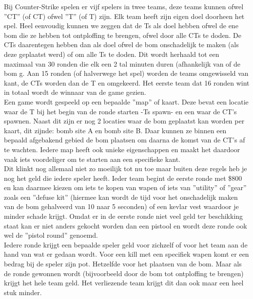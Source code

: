 \documentclass[pdftex,a4paper,12pt,twoside]{report}
\begin{document}
Bij Counter-Strike spelen er vijf spelers in twee teams, deze teams kunnen ofwel ''\gls{CT}'' (of CT) ofwel ''\gls{T}'' (of T) zijn. Elk team heeft zijn eigen doel doorheen het spel. Heel eenvoudig kunnen we zeggen dat de \gls{T}s als doel hebben ofwel de ene bom die ze hebben tot ontploffing te brengen, ofwel door alle \gls{CT}s te doden. 
De \gls{CT}s daarentegen hebben dan als doel ofwel de bom onschadelijk te maken (als deze geplaatst werd) of om alle \gls{T}s te doden. Dit wordt herhaald tot een maximaal van 30 ronden die elk een 2 tal minuten duren (afhankelijk van of de bom g. Aan 15 ronden (of halverwege het spel) worden de teams omgewisseld van kant, de \gls{CT}s worden dan de \gls{T} en omgekeerd. Het eerste team dat 16 ronden wint in totaal wordt de winnaar van de game gezien.
\\

Een game wordt gespeeld op een bepaalde ''\gls{map}'' of kaart. Deze bevat een locatie waar de \gls{T} bij het begin van de ronde starten -\gls{T}s \gls{spawn}- en een waar de CT's \gls{spawn}en. Naast dit zijn er nog 2 locaties waar de bom geplaatst kan worden per kaart, dit zijnde: bomb site A en bomb site B. Daar kunnen ze binnen een bepaald afgebakend gebied de bom plaatsen om daarna de komst van de CT's af te wachten. Iedere \gls{map} heeft ook unieke eigenschappen en maakt het daardoor vaak iets voordeliger om te starten aan een specifieke kant.
\\

Dit klinkt nog allemaal niet zo moeilijk tot nu toe maar buiten deze regels heb je nog het geld die iedere speler heeft. Ieder team begint de eerste ronde met \$800 en kan daarmee kiezen om iets te kopen van wapen of iets van ''utility'' of ''gear'' zoals een ''defuse kit'' (hiermee kan wordt de tijd voor het onschadelijk maken van de bom gehalveerd van 10 naar 5 seconden) of een kevlar vest waardoor je minder schade krijgt. 
Omdat er in de eerste ronde niet veel geld ter beschikking staat kan er niet anders gekocht worden dan een pistool en wordt deze ronde ook wel de ''pistol round'' genoemd.
\\

Iedere ronde krijgt een bepaalde speler geld voor zichzelf of voor het team aan de hand van wat er gedaan wordt. Voor een kill met een specifiek wapen komt er een bedrag bij de speler zijn pot. Hetzelfde voor het plaatsen van de bom. Maar als de ronde gewonnen wordt (bijvoorbeeld door de bom tot ontploffing te brengen) krijgt het hele team geld. Het verliezende team krijgt dit dan ook maar een heel stuk minder.
\\
\end{document}

